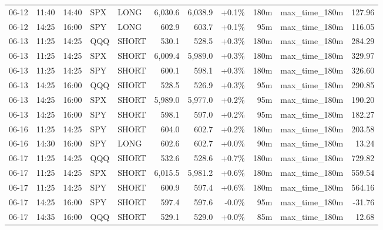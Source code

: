 \documentclass[11pt,a4paper,twoside]{article}
\begin{document}
\begin{center}
\begin{longtable}{>{\color{txtmain}}l l l l l r r r r >{\color{txtmain}}l r}
06-12 & 11:40 & 14:40 & SPX & LONG & 6,030.6 & 6,038.9 & \textcolor{wingreen}{+0.1\%} & 180m & max\_time\_180m & \textcolor{wingreen}{127.96} \\
06-12 & 14:25 & 16:00 & SPY & LONG & 602.9 & 603.7 & \textcolor{wingreen}{+0.1\%} & 95m & max\_time\_180m & \textcolor{wingreen}{116.05} \\
06-13 & 11:25 & 14:25 & QQQ & SHORT & 530.1 & 528.5 & \textcolor{wingreen}{+0.3\%} & 180m & max\_time\_180m & \textcolor{wingreen}{284.29} \\
06-13 & 11:25 & 14:25 & SPX & SHORT & 6,009.4 & 5,989.0 & \textcolor{wingreen}{+0.3\%} & 180m & max\_time\_180m & \textcolor{wingreen}{329.97} \\
06-13 & 11:25 & 14:25 & SPY & SHORT & 600.1 & 598.1 & \textcolor{wingreen}{+0.3\%} & 180m & max\_time\_180m & \textcolor{wingreen}{326.60} \\
06-13 & 14:25 & 16:00 & QQQ & SHORT & 528.5 & 526.9 & \textcolor{wingreen}{+0.3\%} & 95m & max\_time\_180m & \textcolor{wingreen}{290.85} \\
06-13 & 14:25 & 16:00 & SPX & SHORT & 5,989.0 & 5,977.0 & \textcolor{wingreen}{+0.2\%} & 95m & max\_time\_180m & \textcolor{wingreen}{190.20} \\
06-13 & 14:25 & 16:00 & SPY & SHORT & 598.1 & 597.0 & \textcolor{wingreen}{+0.2\%} & 95m & max\_time\_180m & \textcolor{wingreen}{182.27} \\
06-16 & 11:25 & 14:25 & SPY & SHORT & 604.0 & 602.7 & \textcolor{wingreen}{+0.2\%} & 180m & max\_time\_180m & \textcolor{wingreen}{203.58} \\
06-16 & 14:30 & 16:00 & SPY & LONG & 602.6 & 602.7 & \textcolor{wingreen}{+0.0\%} & 90m & max\_time\_180m & \textcolor{wingreen}{13.24} \\
06-17 & 11:25 & 14:25 & QQQ & SHORT & 532.6 & 528.6 & \textcolor{wingreen}{+0.7\%} & 180m & max\_time\_180m & \textcolor{wingreen}{729.82} \\
06-17 & 11:25 & 14:25 & SPX & SHORT & 6,015.5 & 5,981.2 & \textcolor{wingreen}{+0.6\%} & 180m & max\_time\_180m & \textcolor{wingreen}{559.54} \\
06-17 & 11:25 & 14:25 & SPY & SHORT & 600.9 & 597.4 & \textcolor{wingreen}{+0.6\%} & 180m & max\_time\_180m & \textcolor{wingreen}{564.16} \\
06-17 & 14:25 & 16:00 & SPY & SHORT & 597.4 & 597.6 & \textcolor{lossred}{-0.0\%} & 95m & max\_time\_180m & \textcolor{lossred}{-31.76} \\
06-17 & 14:35 & 16:00 & QQQ & SHORT & 529.1 & 529.0 & \textcolor{wingreen}{+0.0\%} & 85m & max\_time\_180m & \textcolor{wingreen}{12.68} \\

\end{longtable}
\end{center}
\end{document}
